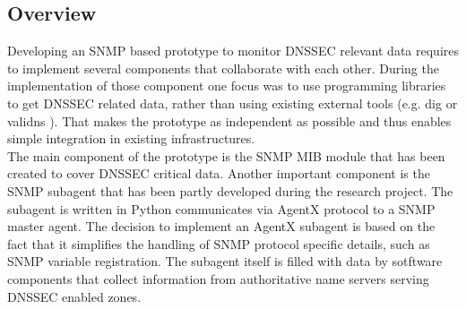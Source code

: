 \subsection{Overview}
\label{section:overview}
Developing an SNMP based prototype to monitor DNSSEC relevant data requires
to implement several components that collaborate with each other. During the implementation of those component one focus was to use programming libraries to get DNSSEC related data, rather than using existing external tools (e.g. dig \cite{dig} or validns \cite{validns}). That makes the prototype as independent as possible and thus enables simple integration in existing infrastructures. 
\\
The main component of the prototype is the SNMP MIB module that has been created to cover DNSSEC critical data. Another important component is the SNMP subagent that has been partly developed during the research project. The subagent is written in Python communicates via AgentX \cite{agentx} protocol to a SNMP master agent. The decision to implement an AgentX subagent is based on the fact that it simplifies the handling of SNMP protocol specific details, such as SNMP variable registration. The subagent itself is filled with data by sotftware components that collect information from authoritative name servers serving DNSSEC enabled zones.

